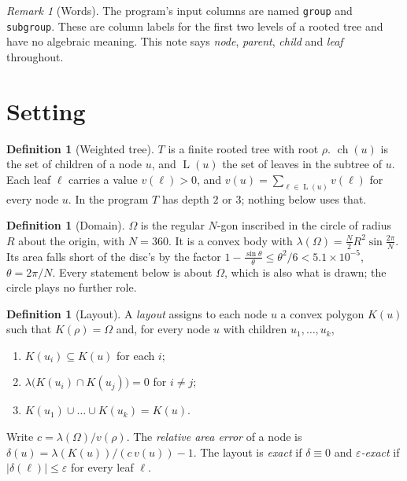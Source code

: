 \documentclass[11pt,a4paper]{article}
\theoremstyle{plain}
\theoremstyle{definition}
\newtheorem{definition}[theorem]{Definition}
\theoremstyle{remark}
\newtheorem{remark}[theorem]{Remark}
\newcommand{\area}{\lambda}
\newcommand{\ch}{\operatorname{ch}}
\newcommand{\leaves}{\operatorname{L}}
\begin{document}
\begin{remark}[Words]\label{rem:words}
The program's input columns are named \texttt{group} and \texttt{subgroup}.
These are column labels for the first two levels of a rooted tree and have no
algebraic meaning. This note says \emph{node}, \emph{parent}, \emph{child} and
\emph{leaf} throughout.
\end{remark}

\section{Setting}

\begin{definition}[Weighted tree]
$T$ is a finite rooted tree with root $\rho$. $\ch(u)$ is the set of children
of a node $u$, and $\leaves(u)$ the set of leaves in the subtree of $u$. Each
leaf $\ell$ carries a value $v(\ell)>0$, and $v(u)=\sum_{\ell\in\leaves(u)}v(\ell)$
for every node $u$. In the program $T$ has depth $2$ or $3$; nothing below
uses that.
\end{definition}

\begin{definition}[Domain]
$\Omega$ is the regular $N$-gon inscribed in the circle of radius $R$ about the
origin, with $N=360$. It is a convex body with
$\area(\Omega)=\tfrac{N}{2}R^2\sin\tfrac{2\pi}{N}$. Its area falls short of the
disc's by the factor $1-\frac{\sin\theta}{\theta}\le\theta^2/6<5.1\times10^{-5}$,
$\theta=2\pi/N$. Every statement below is about $\Omega$, which is also what
is drawn; the circle plays no further role.
\end{definition}

\begin{definition}[Layout]\label{def:layout}
A \emph{layout} assigns to each node $u$ a convex polygon $K(u)$ such that
$K(\rho)=\Omega$ and, for every node $u$ with children $u_1,\dots,u_k$,
\begin{enumerate}[label=(L\arabic*)]
\item $K(u_i)\subseteq K(u)$ for each $i$;
\item $\area\bigl(K(u_i)\cap K(u_j)\bigr)=0$ for $i\ne j$;
\item $K(u_1)\cup\dots\cup K(u_k)=K(u)$.
\end{enumerate}
Write $c=\area(\Omega)/v(\rho)$. The \emph{relative area error} of a node is
$\delta(u)=\area(K(u))/(c\,v(u))-1$. The layout is \emph{exact} if
$\delta\equiv 0$ and \emph{$\varepsilon$-exact} if $\lvert\delta(\ell)\rvert\le\varepsilon$
for every leaf $\ell$.
\end{definition}
\end{document}
